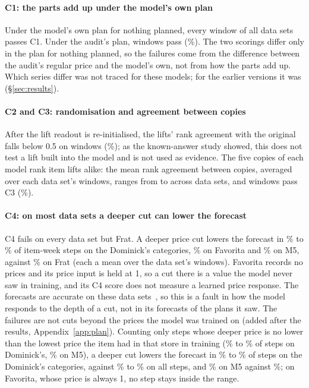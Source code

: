\paragraph{C1: the parts add up under the model's own plan}
Under the model's own plan for nothing planned, every window of all \tSets{}
data sets passes C1. Under the audit's plan, \tCOneWin{} windows pass
(\tCOneWinPct\%). The two scorings differ only in the plan for nothing
planned, so the failures come from the difference between the audit's regular
price and the model's own, not from how the parts add up. Which series differ
was not traced for these models; for the earlier versions it was
(\S\ref{sec:results}).

\paragraph{C2 and C3: randomisation and agreement between copies}
After the lift readout is re-initialised, the lifts' rank agreement with the
original falls below 0.5 on \tCTwoWin{} windows (\tCTwoWinPct\%); as the
known-answer study showed, this does not test a lift built into the model and
is not used as evidence. The five copies of each model rank item lifts alike:
the mean rank agreement between copies, averaged over each data set's windows,
ranges from \tCThreeLo{} to \tCThreeHi{} across data sets, and \tCThreeWin{}
windows pass C3 (\tCThreeWinPct\%).

\paragraph{C4: on most data sets a deeper cut can lower the forecast}
C4 fails on every data set but Frat. A deeper price cut lowers the forecast in
\tCFourDomLo\% to \tCFourDomHi\% of item-week steps on the Dominick's
categories, \tCFourFav\% on Favorita and \tCFourMfive\% on M5, against
\tCFourFrat\% on Frat (each a mean over the data set's windows). Favorita records no prices and its price
input is held at 1, so a cut there is a value the model never saw in training,
and its C4 score does not measure a learned price response. The forecasts
are accurate on these data sets~\cite{rwm}, so this is a fault in how the model
responds to the depth of a cut, not in its forecasts of the plans it saw.
The failures are not cuts beyond the prices the model was trained on (added after the results,
Appendix~\ref{app:plan}). Counting only steps whose deeper price is no lower than the lowest
price the item had in that store in training (\cfoKeptDomLo\% to \cfoKeptDomHi\% of steps on Dominick's,
\cfoKeptMfive\% on M5), a deeper cut lowers the forecast in \cfoObsDomLo\% to \cfoObsDomHi\% of steps on
the Dominick's categories, against \cfoAllDomLo\% to \cfoAllDomHi\% on all steps, and \cfoObsMfive\% on
M5 against \cfoAllMfive\%; on Favorita, whose price is always 1, no step stays inside the range.

